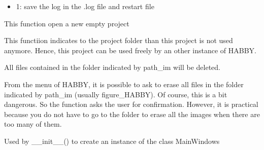 \documentclass[letterpaper,10pt,english]{sphinxmanual}
\begin{document}
\begin{fulllineitems}
\begin{fulllineitems}
\begin{itemize}
\item {} 
1: save the log in the .log file and restart file

\end{itemize}

\end{fulllineitems}


\begin{fulllineitems}
\label{\detokenize{index:src_GUI.Main_windows_1.MainWindows.empty_project}}
This function open a new empty project

\end{fulllineitems}


\begin{fulllineitems}
\label{\detokenize{index:src_GUI.Main_windows_1.MainWindows.end_concurrency}}
This functiion indicates to the project folder than this project is not used anymore. Hence, this project
can be used freely by an other instance of HABBY.

\end{fulllineitems}


\begin{fulllineitems}
\label{\detokenize{index:src_GUI.Main_windows_1.MainWindows.erase_pict}}
All files contained in the folder indicated by path\_im will be deleted.

From the menu of HABBY, it is possible to ask to erase all files in the folder indicated by path\_im
(usually figure\_HABBY). Of course, this is a bit dangerous. So the function asks the user for confirmation.
However, it is practical because you do not have to go to the folder to erase all the images when there
are too many of them.

\end{fulllineitems}


\begin{fulllineitems}
\label{\detokenize{index:src_GUI.Main_windows_1.MainWindows.init_ui}}
Used by \_\_init\_\_() to create an instance of the class MainWindows


\end{fulllineitems}
\end{fulllineitems}
\end{document}

